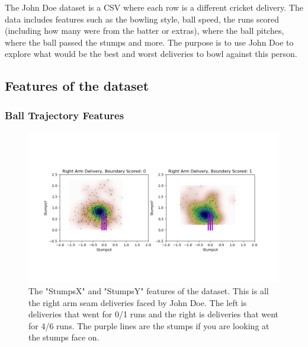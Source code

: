 \documentclass[12pt,a4paper]{report}
\theoremstyle{definition}
\begin{document}
The John Doe dataset is a CSV where each row is a different cricket delivery. 
The data includes features such as the bowling style, ball speed, the runs scored (including how many were from the batter or extras), where the ball pitches, where the ball passed the stumps and more.     
The purpose is to use John Doe to explore what would be the best and worst deliveries to bowl against this person.

\subsection{Features of the dataset}

\subsubsection{Ball Trajectory Features}

\begin{figure}
    \centering
    \includegraphics[width=\linewidth]{post_wicket_right_arm.png}
    \caption{The "StumpsX" and "StumpsY" features of the dataset. This is all the right arm seam deliveries faced by John Doe. The left is deliveries that went for 0/1 runs and the right is deliveries that went for 4/6 runs. The purple lines are the stumps if you are looking at the stumps face on.}
    \label{fig:StumpsXYRight}
\end{figure}
\end{document}
